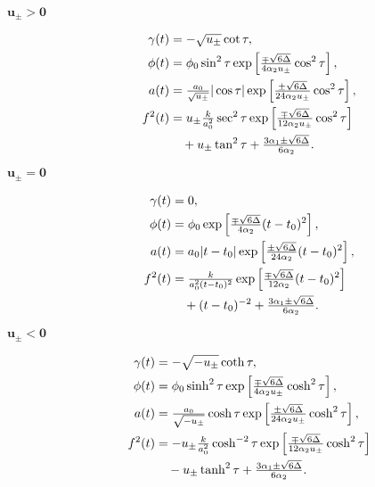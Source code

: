 \documentclass[aps,prd,12pt,superscriptaddress,showpacs,showkeys,longbibliography,reprint,nofootinbib]{revtex4-1}
\begin{document}
\begin{description}
\item[$\bm{u_\pm>0}$]
  \begin{align}
    \gamma(t)&=-\sqrt{u_\pm}\cot\tau,\\
    \phi(t)&=\phi_0\sin^2\tau\exp\left[\tfrac{\mp\sqrt{6\Delta}}{4\alpha_2 u_\pm}\cos^2\tau\right],\\
    a(t)&=\tfrac{a_0}{\sqrt{u_\pm}}|\cos\tau|\exp\left[\tfrac{\pm\sqrt{6\Delta}}{24\alpha_2 u_\pm}\cos^2\tau\right],\\
    f^2(t)&=u_\pm\tfrac{k}{a_0^2}\sec^2\tau\exp\left[\tfrac{\mp\sqrt{6\Delta}}{12\alpha_2u_\pm}\cos^2\tau\right]\notag\\
    &\quad +u_\pm\tan^2\tau + \tfrac{3\alpha_1\pm\sqrt{6\Delta}}{6\alpha_2}.
  \end{align}

\item[$\bm{u_\pm=0}$]
  \begin{align}
    \gamma(t)&=0,\\
    \phi(t)&=\phi_0\exp\left[\tfrac{\mp\sqrt{6\Delta}}{4\alpha_2}(t-t_0)^2\right],\\
    a(t)&=a_0|t-t_0|\exp\left[\tfrac{\pm\sqrt{6\Delta}} {24\alpha_2}(t-t_0)^2\right],\\
    f^2(t)&=\tfrac{k}{a_0^2(t-t_0)^2}\exp\left[\tfrac{\mp\sqrt{6\Delta}}{12\alpha_2}(t-t_0)^2\right]\notag\\
    &\quad +(t-t_0)^{-2} + \tfrac{3\alpha_1\pm\sqrt{6\Delta}}{6\alpha_2}.
  \end{align}

\item[$\bm{u_\pm<0}$]
  \begin{align}
    \gamma(t)&=-\sqrt{-u_\pm}\coth\tau,\\
    \phi(t)&=\phi_0\sinh^2\tau\exp\left[\tfrac{\mp\sqrt{6\Delta}}{4\alpha_2u_\pm}\cosh^2\tau\right],\\
    a(t)&=\tfrac{a_0}{\sqrt{-u_\pm}}\cosh\tau\exp\left[\tfrac{\pm\sqrt{6\Delta}} {24\alpha_2u_\pm}\cosh^2\tau\right],\\
    f^2(t)&=-u_\pm\tfrac{k}{a_0^2}\cosh^{-2}\tau\exp\left[\tfrac{\mp\sqrt{6\Delta}}{12\alpha_2u_\pm}\cosh^2\tau\right]\notag\\
    &\quad -u_\pm\tanh^2\tau + \tfrac{3\alpha_1\pm\sqrt{6\Delta}}{6\alpha_2}.
  \end{align}
\end{description}

\end{document}
